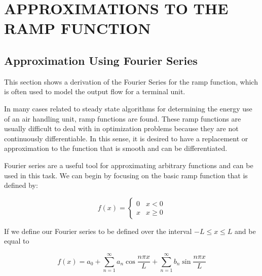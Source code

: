 %
%
%



\chapter{\texorpdfstring{\MakeUppercase{Approximations to the Ramp Function}}{Approximations to the Ramp Function}}

\section{Approximation Using Fourier Series}

This section shows a derivation of the Fourier Series for the ramp
function, which is often used to model the output flow for a terminal
unit.

In many cases related to steady state algorithms for determining the
energy use of an air handling unit, ramp functions are found. These ramp
functions are usually difficult to deal with in optimization problems
because they are not continuously differentiable. In this sense, it is
desired to have a replacement or approximation to the function that is
smooth and can be differentiated. 

Fourier series are a useful tool for approximating arbitrary functions
and can be used in this task. We can begin by focusing on the basic ramp
function that is defined by:

\begin{equation}
f(x)=\begin{cases}0  & x < 0 \\
               x  & x \geq 0
\end{cases}
\end{equation}

If we define our Fourier series to be defined over the interval \(-L
\leq x \leq L\) and be equal to 

\begin{equation}
 f(x) = a_0 + \sum_{n=1}^\infty a_n \cos{\frac{n \pi x }{L}} + \sum_{n=1}^\infty b_n \sin{\frac{n \pi x }{L}}
\end{equation}

